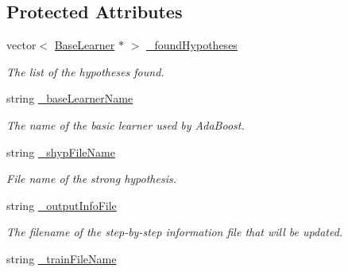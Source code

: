 \subsection*{Protected Attributes}
\begin{DoxyCompactItemize}
\item 
vector$<$ \hyperlink{classMultiBoost_1_1BaseLearner}{Base\-Learner} $\ast$ $>$ \hyperlink{classMultiBoost_1_1SoftCascadeLearner_a6051be1bc49fb0601c3fc5e4fb91091d}{\-\_\-found\-Hypotheses}
\begin{DoxyCompactList}\small\item\em The list of the hypotheses found. \end{DoxyCompactList}\item 
\hypertarget{classMultiBoost_1_1SoftCascadeLearner_a2a78d2edb506b231a1df23978f76a7e6}{string \hyperlink{classMultiBoost_1_1SoftCascadeLearner_a2a78d2edb506b231a1df23978f76a7e6}{\-\_\-base\-Learner\-Name}}\label{classMultiBoost_1_1SoftCascadeLearner_a2a78d2edb506b231a1df23978f76a7e6}

\begin{DoxyCompactList}\small\item\em The name of the basic learner used by Ada\-Boost. \end{DoxyCompactList}\item 
\hypertarget{classMultiBoost_1_1SoftCascadeLearner_a330df7cb13acc64817f3ab629117f4d5}{string \hyperlink{classMultiBoost_1_1SoftCascadeLearner_a330df7cb13acc64817f3ab629117f4d5}{\-\_\-shyp\-File\-Name}}\label{classMultiBoost_1_1SoftCascadeLearner_a330df7cb13acc64817f3ab629117f4d5}

\begin{DoxyCompactList}\small\item\em File name of the strong hypothesis. \end{DoxyCompactList}\item 
\hypertarget{classMultiBoost_1_1SoftCascadeLearner_adf21203aac1b7914797186944e972643}{string \hyperlink{classMultiBoost_1_1SoftCascadeLearner_adf21203aac1b7914797186944e972643}{\-\_\-output\-Info\-File}}\label{classMultiBoost_1_1SoftCascadeLearner_adf21203aac1b7914797186944e972643}

\begin{DoxyCompactList}\small\item\em The filename of the step-\/by-\/step information file that will be updated. \end{DoxyCompactList}\item 
\hypertarget{classMultiBoost_1_1SoftCascadeLearner_af18bf095df5536a6df2bb20198e2ffde}{string \hyperlink{classMultiBoost_1_1SoftCascadeLearner_af18bf095df5536a6df2bb20198e2ffde}{\-\_\-train\-File\-Name}}\label{classMultiBoost_1_1SoftCascadeLearner_af18bf095df5536a6df2bb20198e2ffde}


\end{DoxyCompactItemize}
